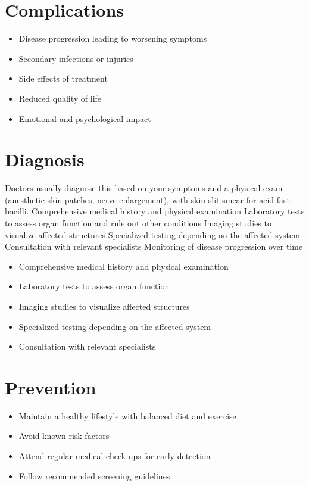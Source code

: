 \section{Complications}
\begin{itemize}[noitemsep]
  \item Disease progression leading to worsening symptoms
  \item Secondary infections or injuries
  \item Side effects of treatment
  \item Reduced quality of life
  \item Emotional and psychological impact
\end{itemize}
\section{Diagnosis}
Doctors usually diagnose this based on your symptoms and a physical exam (anesthetic skin patches, nerve enlargement), with skin slit-smear for acid-fast bacilli. Comprehensive medical history and physical examination Laboratory tests to assess organ function and rule out other conditions Imaging studies to visualize affected structures Specialized testing depending on the affected system Consultation with relevant specialists Monitoring of disease progression over time

\begin{itemize}[noitemsep]
  \item Comprehensive medical history and physical examination
  \item Laboratory tests to assess organ function
  \item Imaging studies to visualize affected structures
  \item Specialized testing depending on the affected system
  \item Consultation with relevant specialists
\end{itemize}
\section{Prevention}
\begin{itemize}[noitemsep]
  \item Maintain a healthy lifestyle with balanced diet and exercise
  \item Avoid known risk factors
  \item Attend regular medical check-ups for early detection
  \item Follow recommended screening guidelines
\end{itemize}
